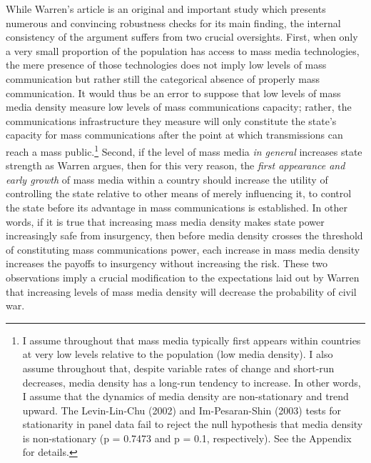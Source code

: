 \documentclass[11pt,article,oneside]{memoir}
\begin{document}
While Warren's article is an original and important study which presents
numerous and convincing robustness checks for its main finding, the
internal consistency of the argument suffers from two crucial
oversights. First, when only a very small proportion of the population
has access to mass media technologies, the mere presence of those
technologies does not imply low levels of mass communication but rather
still the categorical absence of properly mass communication. It would
thus be an error to suppose that low levels of mass media density
measure low levels of mass communications capacity; rather, the
communications infrastructure they measure will only constitute the
state's capacity for mass communications after the point at which
transmissions can reach a mass public.\footnote{I assume throughout that
  mass media typically first appears within countries at very low levels
  relative to the population (low media density). I also assume
  throughout that, despite variable rates of change and short-run
  decreases, media density has a long-run tendency to increase. In other
  words, I assume that the dynamics of media density are non-stationary
  and trend upward. The Levin-Lin-Chu (2002) and Im-Pesaran-Shin (2003)
  tests for stationarity in panel data fail to reject the null
  hypothesis that media density is non-stationary (p = 0.7473 and p =
  0.1, respectively). See the Appendix for details.} Second, if the
level of mass media \emph{in general} increases state strength as Warren
argues, then for this very reason, the \emph{first appearance and early
growth} of mass media within a country should increase the utility of
controlling the state relative to other means of merely influencing it,
to control the state before its advantage in mass communications is
established. In other words, if it is true that increasing mass media
density makes state power increasingly safe from insurgency, then before
media density crosses the threshold of constituting mass communications
power, each increase in mass media density increases the payoffs to
insurgency without increasing the risk. These two observations imply a
crucial modification to the expectations laid out by Warren that
increasing levels of mass media density will decrease the probability of
civil war.
\end{document}
